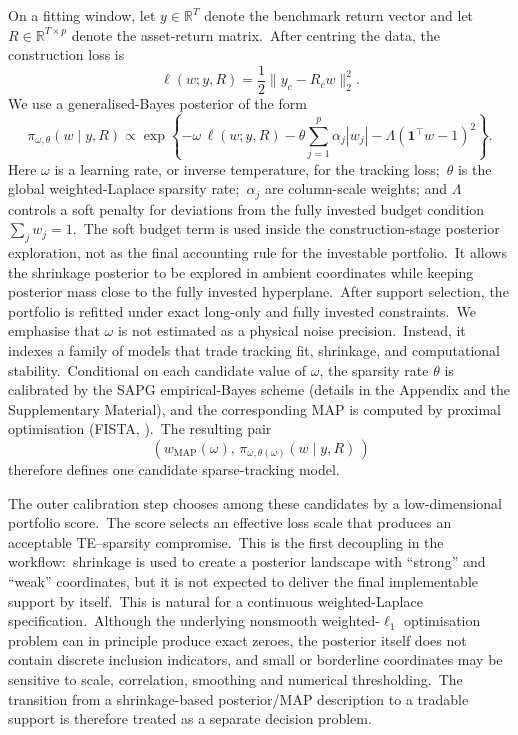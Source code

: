 \documentclass[11pt]{article}
\newcommand{\one}{\mathbf{1}}
\begin{document}
On a fitting window, let \(y\in\mathbb{R}^T\) denote the benchmark return vector and let \(R\in\mathbb{R}^{T\times p}\) denote the asset-return matrix.\ After centring the data, the construction loss is
\begin{equation}
  \ell(w;y,R)
  =
  \frac12\|y_c-R_cw\|_2^2.
  \label{eq:method-loss}
\end{equation}
We use a generalised-Bayes posterior of the form
\begin{equation}
  \pi_{\omega,\theta}(w\mid y,R)
  \propto
  \exp\left\{
     -\omega\,\ell(w;y,R)
     -\theta \sum_{j=1}^p \alpha_j |w_j|
     -\Lambda(\one^\top w-1)^2
  \right\}.
  \label{eq:method-generalised-posterior} 
\end{equation}
Here \(\omega\) is a learning rate, or inverse temperature, for the tracking loss;\ \(\theta\) is the global weighted-Laplace sparsity rate;\ \(\alpha_j\) are column-scale weights; and \(\Lambda\) controls a soft penalty for deviations from the fully invested budget condition \(\sum_j w_j=1\).\ The soft budget term is used inside the construction-stage posterior exploration, not as the final accounting rule for the investable portfolio.\ It allows the shrinkage posterior to be explored in ambient coordinates while keeping posterior mass close to the fully invested hyperplane.\ After support selection, the portfolio is refitted under exact long-only and fully invested constraints.\ We emphasise that \(\omega\) is not estimated as a physical noise precision.\ Instead, it indexes a family of models that trade tracking fit, shrinkage, and computational stability.\ Conditional on each candidate value of \(\omega\), the sparsity rate \(\theta\) is calibrated by the SAPG empirical-Bayes scheme (details in the Appendix and the Supplementary Material), and the corresponding MAP is computed by proximal optimisation (FISTA, \cite{beck2009fista}).\ The resulting pair
\[
 \, \left(w_{\mathrm{MAP}}(\omega),\,\pi_{\omega,\theta(\omega)}(w\mid y,R)\,\right)
\]
therefore defines one candidate sparse-tracking model.

The outer calibration step chooses among these candidates by a low-dimensional portfolio score.\ The score selects an effective loss scale that produces an acceptable TE--sparsity compromise.\ 
This is the first decoupling in the workflow:\ shrinkage is used to create a posterior landscape with ``strong'' and ``weak'' coordinates, but it is not expected to deliver the final implementable support by itself.\ This is natural for a continuous weighted-Laplace specification.\ Although the underlying nonsmooth weighted-\(\ell_1\) optimisation problem can in principle produce exact zeroes, the posterior itself does not contain discrete inclusion indicators, and small or borderline coordinates may be sensitive to scale, correlation, smoothing and numerical thresholding.\ 
The transition from a shrinkage-based posterior/MAP description to a tradable support is therefore treated as a separate decision problem.
\end{document}
